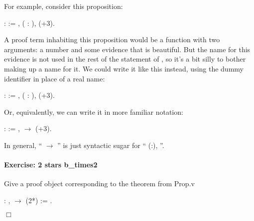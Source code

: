 \documentclass[12pt]{report}
\begin{document}
 For example, consider this proposition: \begin{coqdoccode}
\coqdocemptyline
\coqdocnoindent
{}  :  := \coqdoceol
\coqdocindent{1.00em}
\coqdockw{\ensuremath{\forall}} , \coqdockw{\ensuremath{\forall}} ( :  ),  (+3).\coqdoceol
\coqdocemptyline
\end{coqdoccode}
A proof term inhabiting this proposition would be a function
    with two arguments: a number  and some evidence  that  is
    beautiful.  But the name  for this evidence is not used in the
    rest of the statement of , so it's a bit silly to
    bother making up a name for it.  We could write it like this
    instead, using the dummy identifier \coqdocvar{\_} in place of a real
    name: \begin{coqdoccode}
\coqdocemptyline
\coqdocnoindent
{}  :  := \coqdoceol
\coqdocindent{1.00em}
\coqdockw{\ensuremath{\forall}} , \coqdockw{\ensuremath{\forall}} (\coqdocvar{\_} :  ),  (+3).\coqdoceol
\coqdocemptyline
\end{coqdoccode}
Or, equivalently, we can write it in more familiar notation: \begin{coqdoccode}
\coqdocemptyline
\coqdocnoindent
{}  :  :=\coqdoceol
\coqdocindent{1.00em}
\coqdockw{\ensuremath{\forall}} ,   \ensuremath{\rightarrow}  (+3).\coqdoceol
\coqdocemptyline
\end{coqdoccode}
In general, `` \ensuremath{\rightarrow} '' is just syntactic sugar for
    ``\coqdockw{\ensuremath{\forall}} (\coqdocvar{\_}:), ''. 

\paragraph{Exercise: 2 stars b\_times2}



 Give a proof object corresponding to the theorem  from Prop.v \begin{coqdoccode}
\coqdocemptyline
\coqdocnoindent
{} : \coqdockw{\ensuremath{\forall}} ,   \ensuremath{\rightarrow}  (2*) :=\coqdoceol
\coqdocindent{1.00em}
 .\coqdoceol
\end{coqdoccode}
\ensuremath{\Box} 
\end{document}
